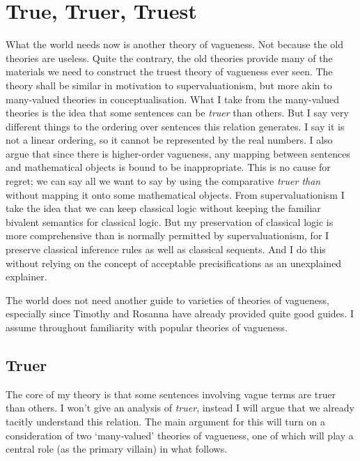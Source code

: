\hypertarget{true-truer-truest}{%
\section{True, Truer, Truest}\label{true-truer-truest}}

What the world needs now is another theory of vagueness. Not because the
old theories are useless. Quite the contrary, the old theories provide
many of the materials we need to construct the truest theory of
vagueness ever seen. The theory shall be similar in motivation to
supervaluationism, but more akin to many-valued theories in
conceptualisation. What I take from the many-valued theories is the idea
that some sentences can be \emph{truer} than others. But I say very
different things to the ordering over sentences this relation generates.
I say it is not a linear ordering, so it cannot be represented by the
real numbers. I also argue that since there is higher-order vagueness,
any mapping between sentences and mathematical objects is bound to be
inappropriate. This is no cause for regret; we can say all we want to
say by using the comparative \emph{truer than} without mapping it onto
some mathematical objects. From supervaluationism I take the idea that
we can keep classical logic without keeping the familiar bivalent
semantics for classical logic. But my preservation of classical logic is
more comprehensive than is normally permitted by supervaluationism, for
I preserve classical inference rules as well as classical sequents. And
I do this without relying on the concept of acceptable precisifications
as an unexplained explainer.

The world does not need another guide to varieties of theories of
vagueness, especially since Timothy \citet{Williamson1994-WILV} and
Rosanna \citet{Keefe2000} have already provided quite good guides. I
assume throughout familiarity with popular theories of vagueness.

\hypertarget{truer}{%
\subsection{Truer}\label{truer}}

The core of my theory is that some sentences involving vague terms are
truer than others. I won't give an analysis of \emph{truer}, instead I
will argue that we already tacitly understand this relation. The main
argument for this will turn on a consideration of two `many-valued'
theories of vagueness, one of which will play a central role (as the
primary villain) in what follows.

